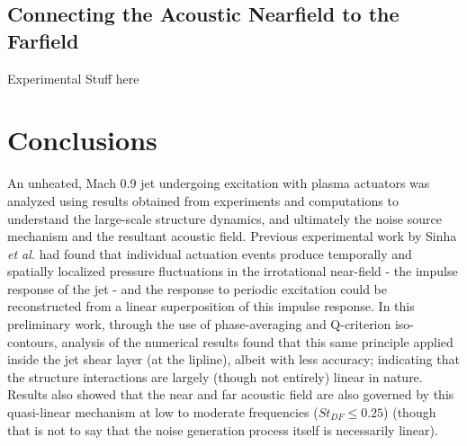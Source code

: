 \documentclass[english]{aiaa-tc}
\begin{document}
\subsection{Connecting the Acoustic Nearfield to the Farfield}
Experimental Stuff here

\section{Conclusions}
An unheated, Mach 0.9 jet undergoing excitation with plasma actuators was analyzed using results obtained from experiments and computations to understand the large-scale structure dynamics, and ultimately the noise source mechanism and the resultant acoustic field. Previous experimental work by Sinha \textit{et al.}\cite{sinha2013} had found that individual actuation events produce temporally and spatially localized pressure fluctuations in the irrotational near-field - the impulse response of the jet - and the response to periodic excitation could be reconstructed from a linear superposition of this impulse response. In this preliminary work, through the use of phase-averaging and Q-criterion iso-contours, analysis of the numerical results found that this same principle applied inside the jet shear layer (at the lipline), albeit with less accuracy; indicating that the structure interactions are largely (though not entirely) linear in nature. Results also showed that the near and far acoustic field are also governed by this quasi-linear mechanism at low to moderate frequencies ($St_{DF} \leq 0.25$) (though that is not to say that the noise generation process itself is necessarily linear). 
 
\end{document}
